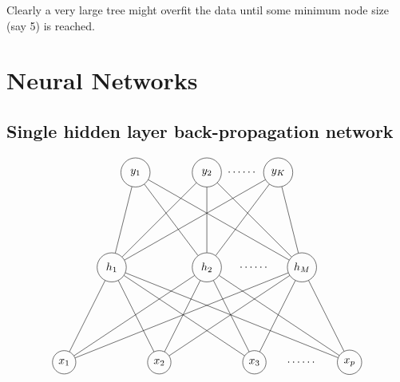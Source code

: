 \documentclass{report}
\theoremstyle{nonumberplain}
\newcommand{\0}{\mathbf{0}}
\begin{document}
Clearly a very large tree might overfit
the data until some minimum node size (say 5) is reached.

\chapter{Neural Networks}
\section{Single hidden layer back-propagation network}
\[
\begin{tikzpicture}[scale=1.5]
\draw (0,0) node [draw,shape=circle] (x1) {$x_1$};
\draw (2,0) node [draw,shape=circle] (x2) {$x_2$};
\draw (4,0) node [draw,shape=circle] (x3) {$x_3$};
\draw (5,0) node (xdots) {$\cdots\cdots$};
\draw (6,0) node [draw,shape=circle] (xp) {$x_p$};
\draw (1,2) node [draw,shape=circle,minimum height=0.92cm] (z1) {$h_1$};
\draw (3,2) node [draw,shape=circle,minimum height=0.92cm] (z2) {$h_2$};
\draw (4,2) node (zdots) {$\cdots\cdots$};
\draw (5,2) node [draw,shape=circle,minimum height=0.92cm] (zm) {$h_M$};
\draw (1.5,4) node [draw,shape=circle,minimum height=0.92cm] (y1) {$y_1$};
\draw (3,4) node [draw,shape=circle,minimum height=0.92cm] (y2) {$y_2$};
\draw (3.75,4) node (ydots) {$\cdots\cdots$};
\draw (4.5,4) node [draw,shape=circle,minimum height=0.92cm] (yk) {$y_K$};
\draw 
(x1) -- node[pos=0.1,above]{} node[pos=0.85,above]{} (z1)
(x1) -- node[pos=0.1,below]{} node[pos=0.85,below]{}(z2)
(x1) -- node[pos=0.1,above]{} node[pos=0.85,above]{} (zm)
(x2) -- node[pos=0.05,anchor=90]{} node[pos=0.85,below]{} (z1)
(x2) -- node[pos=0.1,below]{} node[pos=0.85,below]{} (z2)
(x2) -- node[pos=0.1,above]{} node[pos=0.85,above]{} (zm)
(x3) -- node[pos=0.1,above]{} node[pos=0.85,above]{} (z1)
(x3) -- node[pos=0.1,above]{} node[pos=0.85,above]{} (z2)
(x3) -- node[pos=0.1,above]{} node[pos=0.85,above]{} (zm)
(xp) -- node[pos=0.1,above]{} node[pos=0.85,above]{} (z1)
(xp) -- node[pos=0.1,above]{} node[pos=0.85,above]{} (z2)
(xp) -- node[pos=0.1,above]{} node[pos=0.85,above]{} (zm)
(z1) -- node[pos=0.1,above]{} node[pos=0.85,above]{} (y1)
(z1) -- node[pos=0.1,above]{} node[pos=0.85,above]{} (y2)
(z1) -- node[pos=0.1,above]{} node[pos=0.85,above]{} (yk)
(z2) -- node[pos=0.1,above]{} node[pos=0.85,above]{} (y1)
(z2) -- node[pos=0.1,above]{} node[pos=0.85,above]{} (y2)
(z2) -- node[pos=0.1,above]{} node[pos=0.85,above]{} (yk)
(zm) -- node[pos=0.1,above]{} node[pos=0.85,above]{} (y1)
(zm) -- node[pos=0.1,above]{} node[pos=0.85,above]{} (y2)
(zm) -- node[pos=0.1,above]{} node[pos=0.85,above]{} (yk)
;
\end{tikzpicture}
\]
\end{document}
